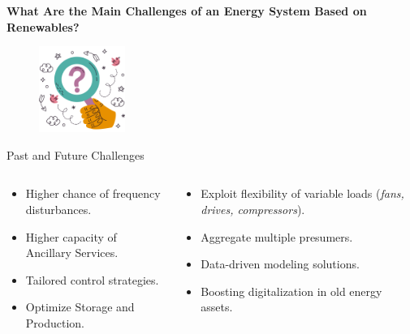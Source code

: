 \documentclass[aspectratio=169,hyperref={pdfpagelabels=false}]{beamer}
\begin{document}
\begin{frame}{}
  \begin{center}
  \Large{\textbf{What Are the Main Challenges of an Energy System Based on Renewables?}}
  \end{center}
  \vspace{1em}
  \begin{figure}[t]
    \includegraphics[width=0.25\textwidth]{img/pic5.png} \centering
    \centering
    \end{figure}
  
\end{frame}
        
\begin{frame}{\Large{Past and Future Challenges}}
  \begin{columns}
    \begin{column}{0.5\textwidth}
      \begin{itemize}
        \item Higher chance of frequency disturbances. 
        \item Higher capacity of Ancillary Services. 
        \item Tailored control strategies. 
        \item Optimize Storage and Production. \pause
      \end{itemize}
    \end{column}

    \begin{column}{0.5\textwidth}
      \begin{itemize}
        \item Exploit flexibility of variable loads (\textit{fans, drives, compressors}). 
        \item Aggregate multiple presumers.
        \item Data-driven modeling solutions. 
        \item Boosting digitalization in old energy assets. 
      \end{itemize}
    \end{column}
  \end{columns}
\end{frame}
\end{document}
